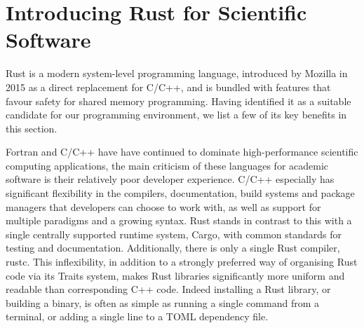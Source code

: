 \section{Introducing Rust for Scientific Software}\label{chpt:1:sec:2}

Rust is a modern system-level programming language, introduced by Mozilla in 2015 as a direct replacement for C/C++, and is bundled with features that favour safety for shared memory programming. Having identified it as a suitable candidate for our programming environment, we list a few of its key benefits in this section.

Fortran and C/C++ have have continued to dominate high-performance scientific computing applications, the main criticism of these languages for academic software is their relatively poor developer experience. C/C++ especially has significant flexibility in the compilers, documentation, build systems and package managers that developers can choose to work with, as well as support for multiple paradigms and a growing syntax. Rust stands in contrast to this with a single centrally supported runtime system, Cargo, with common standards for testing and documentation. Additionally, there is only a single Rust compiler, rustc. This inflexibility, in addition to a strongly preferred way of organising Rust code via its Traits system, makes Rust libraries significantly more uniform and readable than corresponding C++ code. Indeed installing a Rust library, or building a binary, is often as simple as running a single command from a terminal, or adding a single line to a TOML dependency file.

